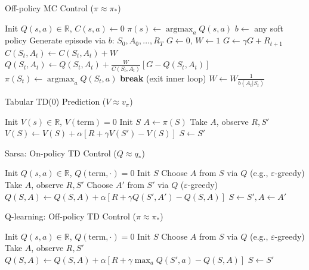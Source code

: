 \documentclass[10pt]{article}
\DeclareMathOperator*{\argmax}{argmax}
\begin{document}
\begin{multicols*}{2}
	\begin{algorithm}[H]
		\caption{Off-policy MC Control ($\pi \approx \pi_*$)}
		\begin{algorithmic}[1]
			\State Init $Q(s, a) \in \mathbb{R}$, $C(s, a) \gets 0$
			\State $\pi(s) \gets \argmax_a Q(s, a)$
			\State $b \gets$ any soft policy
			\State Generate episode via $b$: $S_0, A_0, \dots, R_T$
			\State $G \gets 0$, $W \gets 1$
			\State $G \gets \gamma G + R_{t+1}$
			\State $C(S_t, A_t) \gets C(S_t, A_t) + W$
			\State $Q(S_t, A_t) \gets Q(S_t, A_t) + \frac{W}{C(S_t, A_t)} [G - Q(S_t, A_t)]$
			\State $\pi(S_t) \gets \argmax_a Q(S_t, a)$
			 \textbf{break} (exit inner loop) \EndIf
			\State $W \gets W \frac{1}{b(A_t|S_t)}$
			\EndFor
			\EndFor
		\end{algorithmic}
	\end{algorithm}

	\begin{algorithm}[H]
		\caption{Tabular TD(0) Prediction ($V \approx v_\pi$)}
		\begin{algorithmic}[1]
			\State Init $V(s) \in \mathbb{R}$, $V(\text{term}) = 0$
			\State Init $S$
			\Repeat
			\State $A \gets \pi(S)$
			\State Take $A$, observe $R, S'$
			\State $V(S) \gets V(S) + \alpha [R + \gamma V(S') - V(S)]$
			\State $S \gets S'$
			\EndFor
		\end{algorithmic}
	\end{algorithm}

	\begin{algorithm}[H]
		\caption{Sarsa: On-policy TD Control ($Q \approx q_*$)}
		\begin{algorithmic}[1]
			\State Init $Q(s, a) \in \mathbb{R}$, $Q(\text{term}, \cdot) = 0$
			\State Init $S$
			\State Choose $A$ from $S$ via $Q$ (e.g., $\varepsilon$-greedy)
			\Repeat
			\State Take $A$, observe $R, S'$
			\State Choose $A'$ from $S'$ via $Q$ ($\varepsilon$-greedy)
			\State $Q(S,A) \gets Q(S,A) + \alpha [R + \gamma Q(S',A') - Q(S,A)]$
			\State $S \gets S', A \gets A'$
			\EndFor
		\end{algorithmic}
	\end{algorithm}

	\begin{algorithm}[H]
		\caption{Q-learning: Off-policy TD Control ($\pi \approx \pi_*$)}
		\begin{algorithmic}[1]
			\State Init $Q(s, a) \in \mathbb{R}$, $Q(\text{term}, \cdot) = 0$
			\State Init $S$
			\Repeat
			\State Choose $A$ from $S$ via $Q$ (e.g., $\varepsilon$-greedy)
			\State Take $A$, observe $R, S'$
			\State $Q(S,A) \gets Q(S,A) + \alpha [R + \gamma \max_a Q(S', a) - Q(S,A)]$
			\State $S \gets S'$
			\EndFor
		\end{algorithmic}
	\end{algorithm}


\end{multicols*}
\end{document}
